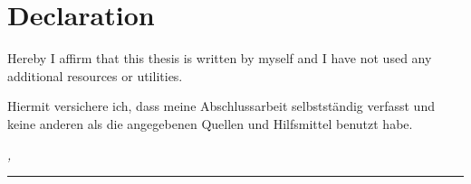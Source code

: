 %
\chapter*{Declaration}
\label{sec:declaration}
\thispagestyle{empty}

Hereby I affirm that this thesis is written by myself and I have not used any 
additional resources or utilities.

\begin{center}
	\hrulefill
\end{center}

Hiermit versichere ich, dass meine Abschlussarbeit selbstständig verfasst und 
keine anderen als die angegebenen Quellen und Hilfsmittel benutzt habe.

\bigskip

\noindent\textit{\thesisUniversityCity, \thesisDate}

\smallskip

\begin{flushright}
	\begin{minipage}{5cm}
		\rule{\textwidth}{1pt}
		\centering\thesisName
	\end{minipage}
\end{flushright}

